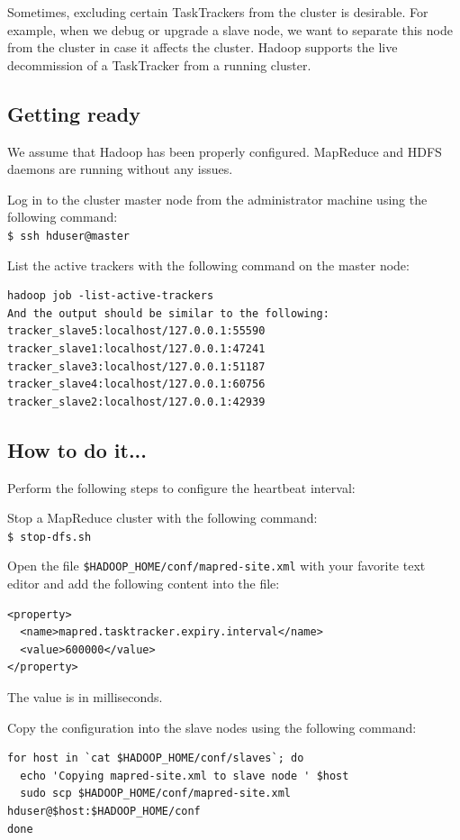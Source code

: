 Sometimes, excluding certain TaskTrackers from the cluster is desirable. For example, when we debug or upgrade a slave node, we want to separate this node from the cluster in case it affects the cluster. Hadoop supports the live decommission of a TaskTracker from a running cluster.

\subsection*{Getting ready}
We assume that Hadoop has been properly configured. MapReduce and HDFS daemons are running without any issues.

Log in to the cluster master node from the administrator machine using the following command: \\
\verb|$ ssh hduser@master|

List the active trackers with the following command on the master node:
\begin{verbatim} 
hadoop job -list-active-trackers
And the output should be similar to the following:
tracker_slave5:localhost/127.0.0.1:55590
tracker_slave1:localhost/127.0.0.1:47241
tracker_slave3:localhost/127.0.0.1:51187
tracker_slave4:localhost/127.0.0.1:60756
tracker_slave2:localhost/127.0.0.1:42939
\end{verbatim}

\subsection*{How to do it...}
Perform the following steps to configure the heartbeat interval: 

Stop a MapReduce cluster with the following command:\\
\verb|$ stop-dfs.sh|

Open the file \verb|$HADOOP_HOME/conf/mapred-site.xml| with your favorite text editor and add the following content into the file:
\begin{verbatim} 
<property>
  <name>mapred.tasktracker.expiry.interval</name>
  <value>600000</value>
</property>
\end{verbatim}

The value is in milliseconds.

Copy the configuration into the slave nodes using the following command:
\begin{verbatim} 
for host in `cat $HADOOP_HOME/conf/slaves`; do
  echo 'Copying mapred-site.xml to slave node ' $host
  sudo scp $HADOOP_HOME/conf/mapred-site.xml hduser@$host:$HADOOP_HOME/conf
done
\end{verbatim}

